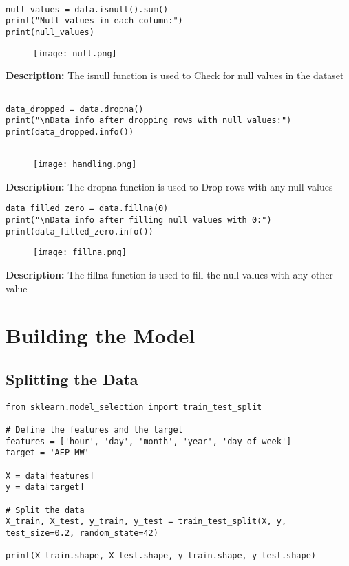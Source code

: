 \documentclass{article}
\begin{document}
\begin{lstlisting}[caption={Checking and handling null values}]

null_values = data.isnull().sum()
print("Null values in each column:")
print(null_values)
\end{lstlisting}
\begin{figure}[H]
    \centering
    \texttt{[image: null.png]}
\end{figure}
\textbf{Description:}
 The isnull function is used to Check for null values in the dataset
\begin{lstlisting}

data_dropped = data.dropna()
print("\nData info after dropping rows with null values:")
print(data_dropped.info())
 
\end{lstlisting}
\begin{figure}[H]
    \centering
    \texttt{[image: handling.png]}
\end{figure}
\textbf{Description:}
The dropna function is used to Drop rows with any null values

\begin{lstlisting}
data_filled_zero = data.fillna(0)
print("\nData info after filling null values with 0:")
print(data_filled_zero.info())
\end{lstlisting}

\begin{figure}[H]
    \centering
    \texttt{[image: fillna.png]}
\end{figure}
\textbf{Description:}
The fillna function is used to fill the null values with any other value
\section{Building the Model}


\subsection{Splitting the Data}

\begin{lstlisting}[caption={Splitting the dataset}]
from sklearn.model_selection import train_test_split

# Define the features and the target
features = ['hour', 'day', 'month', 'year', 'day_of_week']
target = 'AEP_MW'

X = data[features]
y = data[target]

# Split the data
X_train, X_test, y_train, y_test = train_test_split(X, y, test_size=0.2, random_state=42)

print(X_train.shape, X_test.shape, y_train.shape, y_test.shape)
\end{lstlisting}
\end{document}
